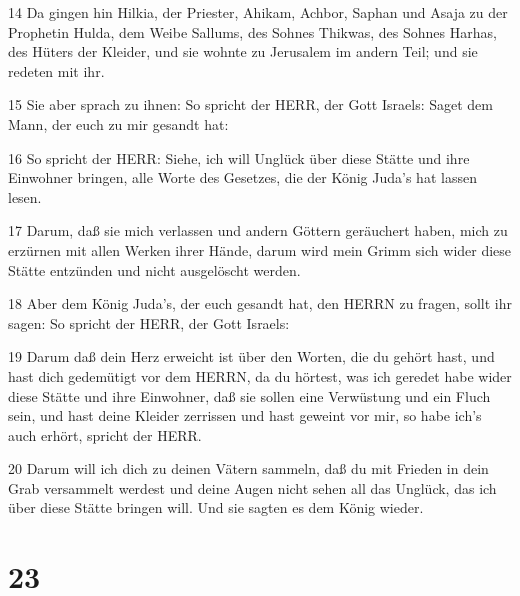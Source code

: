 \par 14 Da gingen hin Hilkia, der Priester, Ahikam, Achbor, Saphan und Asaja zu der Prophetin Hulda, dem Weibe Sallums, des Sohnes Thikwas, des Sohnes Harhas, des Hüters der Kleider, und sie wohnte zu Jerusalem im andern Teil; und sie redeten mit ihr.
\par 15 Sie aber sprach zu ihnen: So spricht der HERR, der Gott Israels: Saget dem Mann, der euch zu mir gesandt hat:
\par 16 So spricht der HERR: Siehe, ich will Unglück über diese Stätte und ihre Einwohner bringen, alle Worte des Gesetzes, die der König Juda's hat lassen lesen.
\par 17 Darum, daß sie mich verlassen und andern Göttern geräuchert haben, mich zu erzürnen mit allen Werken ihrer Hände, darum wird mein Grimm sich wider diese Stätte entzünden und nicht ausgelöscht werden.
\par 18 Aber dem König Juda's, der euch gesandt hat, den HERRN zu fragen, sollt ihr sagen: So spricht der HERR, der Gott Israels:
\par 19 Darum daß dein Herz erweicht ist über den Worten, die du gehört hast, und hast dich gedemütigt vor dem HERRN, da du hörtest, was ich geredet habe wider diese Stätte und ihre Einwohner, daß sie sollen eine Verwüstung und ein Fluch sein, und hast deine Kleider zerrissen und hast geweint vor mir, so habe ich's auch erhört, spricht der HERR.
\par 20 Darum will ich dich zu deinen Vätern sammeln, daß du mit Frieden in dein Grab versammelt werdest und deine Augen nicht sehen all das Unglück, das ich über diese Stätte bringen will. Und sie sagten es dem König wieder.

\chapter{23}

